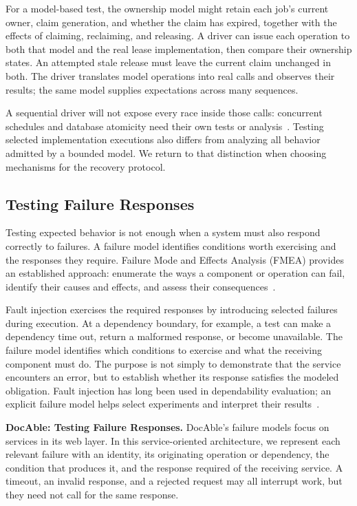 For a model-based test, the ownership model might retain each job's current owner, claim generation, and whether the claim has expired, together with the effects of claiming, reclaiming, and releasing. A driver can issue each operation to both that model and the real lease implementation, then compare their ownership states. An attempted stale release must leave the current claim unchanged in both. The driver translates model operations into real calls and observes their results; the same model supplies expectations across many sequences.

A sequential driver will not expose every race inside those calls: concurrent schedules and database atomicity need their own tests or analysis~\citep{prenninger2005abstractions}. Testing selected implementation executions also differs from analyzing all behavior admitted by a bounded model. We return to that distinction when choosing mechanisms for the recovery protocol.

\subsection{Testing Failure Responses}\label{heading:model-and-exercise-failure-responses}

Testing expected behavior is not enough when a system must also respond correctly to failures. A failure model identifies conditions worth exercising and the responses they require. Failure Mode and Effects Analysis (FMEA) provides an established approach: enumerate the ways a component or operation can fail, identify their causes and effects, and assess their consequences~\citep{iec60812_2018}.

Fault injection exercises the required responses by introducing selected failures during execution. At a dependency boundary, for example, a test can make a dependency time out, return a malformed response, or become unavailable. The failure model identifies which conditions to exercise and what the receiving component must do. The purpose is not simply to demonstrate that the service encounters an error, but to establish whether its response satisfies the modeled obligation. Fault injection has long been used in dependability evaluation; an explicit failure model helps select experiments and interpret their results~\citep{hsueh1997fault}.

\textbf{DocAble: Testing Failure Responses.} DocAble's failure models focus on services in its web layer. In this service-oriented architecture, we represent each relevant failure with an identity, its originating operation or dependency, the condition that produces it, and the response required of the receiving service. A timeout, an invalid response, and a rejected request may all interrupt work, but they need not call for the same response.

